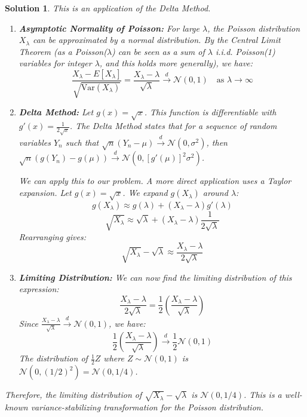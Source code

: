 \documentclass[12pt]{amsart}
\newtheorem*{solution}{Solution}
\begin{document}
\begin{solution}
This is an application of the Delta Method.
\begin{enumerate}
    \item \textbf{Asymptotic Normality of Poisson:} For large $\lambda$, the Poisson distribution $X_\lambda$ can be approximated by a normal distribution. By the Central Limit Theorem (as a Poisson($\lambda$) can be seen as a sum of $\lambda$ i.i.d. Poisson(1) variables for integer $\lambda$, and this holds more generally), we have:
    $$ \frac{X_\lambda - E[X_\lambda]}{\sqrt{\text{Var}(X_\lambda)}} = \frac{X_\lambda - \lambda}{\sqrt{\lambda}} \stackrel{d}{\longrightarrow} \mathcal{N}(0,1) \quad \text{as } \lambda \to \infty $$

    \item \textbf{Delta Method:} Let $g(x) = \sqrt{x}$. This function is differentiable with $g'(x) = \frac{1}{2\sqrt{x}}$.
    The Delta Method states that for a sequence of random variables $Y_n$ such that $\sqrt{n}(Y_n - \mu) \stackrel{d}{\to} \mathcal{N}(0, \sigma^2)$, then $\sqrt{n}(g(Y_n) - g(\mu)) \stackrel{d}{\to} \mathcal{N}(0, [g'(\mu)]^2 \sigma^2)$.
    
    We can apply this to our problem. A more direct application uses a Taylor expansion. Let $g(x) = \sqrt{x}$. We expand $g(X_\lambda)$ around $\lambda$:
    $$ g(X_\lambda) \approx g(\lambda) + (X_\lambda - \lambda)g'(\lambda) $$
    $$ \sqrt{X_\lambda} \approx \sqrt{\lambda} + (X_\lambda - \lambda)\frac{1}{2\sqrt{\lambda}} $$
    Rearranging gives:
    $$ \sqrt{X_\lambda} - \sqrt{\lambda} \approx \frac{X_\lambda - \lambda}{2\sqrt{\lambda}} $$

    \item \textbf{Limiting Distribution:} We can now find the limiting distribution of this expression:
    $$ \frac{X_\lambda - \lambda}{2\sqrt{\lambda}} = \frac{1}{2} \left( \frac{X_\lambda - \lambda}{\sqrt{\lambda}} \right) $$
    Since $\frac{X_\lambda - \lambda}{\sqrt{\lambda}} \stackrel{d}{\to} \mathcal{N}(0,1)$, we have:
    $$ \frac{1}{2} \left( \frac{X_\lambda - \lambda}{\sqrt{\lambda}} \right) \stackrel{d}{\to} \frac{1}{2} \mathcal{N}(0,1) $$
    The distribution of $\frac{1}{2}Z$ where $Z \sim \mathcal{N}(0,1)$ is $\mathcal{N}(0, (1/2)^2) = \mathcal{N}(0, 1/4)$.
\end{enumerate}
Therefore, the limiting distribution of $\sqrt{X_\lambda}-\sqrt{\lambda}$ is $\mathcal{N}(0, 1/4)$. This is a well-known variance-stabilizing transformation for the Poisson distribution.
\end{solution}
\end{document}
